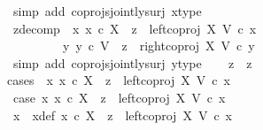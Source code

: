 \begin{isabellebody}
\ {\isacharparenleft}{\kern0pt}simp\ add{\isacharcolon}{\kern0pt}\ coprojs{\isacharunderscore}{\kern0pt}jointly{\isacharunderscore}{\kern0pt}surj\ x{\isacharunderscore}{\kern0pt}type{}{\isacharparenright}{\kern0pt}\isanewline
\isanewline
\ \ \isamarkupfalse%
\ z{}{\isacharunderscore}{\kern0pt}decomp{\isacharcolon}{\kern0pt}\ {\isachardoublequoteopen}{\isacharparenleft}{\kern0pt}{\isasymexists}\ x{}{\isachardot}{\kern0pt}\ {\isacharparenleft}{\kern0pt}x{}\ {\isasymin}\isactrlsub c\ X\ {\isasymand}\ z{}\ {\isacharequal}{\kern0pt}\ left{\isacharunderscore}{\kern0pt}coproj\ X\ V\ {\isasymcirc}\isactrlsub c\ x{}{\isacharparenright}{\kern0pt}{\isacharparenright}{\kern0pt}\isanewline
\ \ \ \ \ \ {\isasymor}\ \ {\isacharparenleft}{\kern0pt}{\isasymexists}\ y{}{\isachardot}{\kern0pt}\ {\isacharparenleft}{\kern0pt}y{}\ {\isasymin}\isactrlsub c\ V\ {\isasymand}\ z{}\ {\isacharequal}{\kern0pt}\ right{\isacharunderscore}{\kern0pt}coproj\ X\ V\ {\isasymcirc}\isactrlsub c\ y{}{\isacharparenright}{\kern0pt}{\isacharparenright}{\kern0pt}{\isachardoublequoteclose}\isanewline
\ \ \ \ \isamarkupfalse%
\ {\isacharparenleft}{\kern0pt}simp\ add{\isacharcolon}{\kern0pt}\ coprojs{\isacharunderscore}{\kern0pt}jointly{\isacharunderscore}{\kern0pt}surj\ y{\isacharunderscore}{\kern0pt}type{}{\isacharparenright}{\kern0pt}\isanewline
\isanewline
\ \ \isamarkupfalse%
\ {\isachardoublequoteopen}z{}\ {\isacharequal}{\kern0pt}\ z{}{\isachardoublequoteclose}\isanewline
\ \ \isamarkupfalse%
{\isacharparenleft}{\kern0pt}cases\ {\isachardoublequoteopen}{\isasymexists}\ x{}{\isachardot}{\kern0pt}\ x{}\ {\isasymin}\isactrlsub c\ X\ {\isasymand}\ z{}\ {\isacharequal}{\kern0pt}\ left{\isacharunderscore}{\kern0pt}coproj\ X\ V\ {\isasymcirc}\isactrlsub c\ x{}{\isachardoublequoteclose}{\isacharparenright}{\kern0pt}\isanewline
\ \ \ \ \isamarkupfalse%
\ case{}{\isacharcolon}{\kern0pt}\ {\isachardoublequoteopen}{\isasymexists}x{}{\isachardot}{\kern0pt}\ x{}\ {\isasymin}\isactrlsub c\ X\ {\isasymand}\ z{}\ {\isacharequal}{\kern0pt}\ left{\isacharunderscore}{\kern0pt}coproj\ X\ V\ {\isasymcirc}\isactrlsub c\ x{}{\isachardoublequoteclose}\isanewline
\ \ \ \ \isamarkupfalse%
\ x{}\ \ x{}{\isacharunderscore}{\kern0pt}def{\isacharcolon}{\kern0pt}\ {\isachardoublequoteopen}x{}\ {\isasymin}\isactrlsub c\ X\ {\isasymand}\ z{}\ {\isacharequal}{\kern0pt}\ left{\isacharunderscore}{\kern0pt}coproj\ X\ V\ {\isasymcirc}\isactrlsub c\ x{}{\isachardoublequoteclose}\isanewline

\end{isabellebody}
